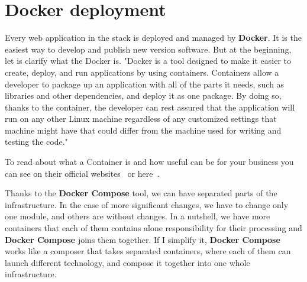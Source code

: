 \section{Docker deployment}\label{sec:docker-deployment}
Every web application in the stack is deployed and managed by \textbf{Docker}.
It is the easiest way to develop and publish new version software.
But at the beginning, let is clarify what the Docker is.
"Docker is a tool designed to make it easier to create, deploy, and run applications by using containers.
Containers allow a developer to package up an application with all of the parts it needs, such as libraries and other dependencies, and deploy it as one package.
By doing so, thanks to the container, the developer can rest assured that the application will run on any other Linux machine regardless of any customized settings that machine might have that could differ from the machine used for writing and testing the code."\cite{dockerDescription}

To read about what a Container is and how useful can be for your business you can see on their official websites~\cite{dockerContainer} or here~\cite{dockerDescription}.

Thanks to the \textbf{Docker Compose} tool, we can have separated parts of the infrastructure.
In the case of more significant changes, we have to change only one module, and others are without changes.
In a nutshell, we have more containers that each of them contains alone responsibility for their processing and \textbf{Docker Compose} joins them together.
If I simplify it, \textbf{Docker Compose} works like a composer that takes separated containers, where each of them can launch different technology, and compose it together into one whole infrastructure.\cite{dockerCompose}

